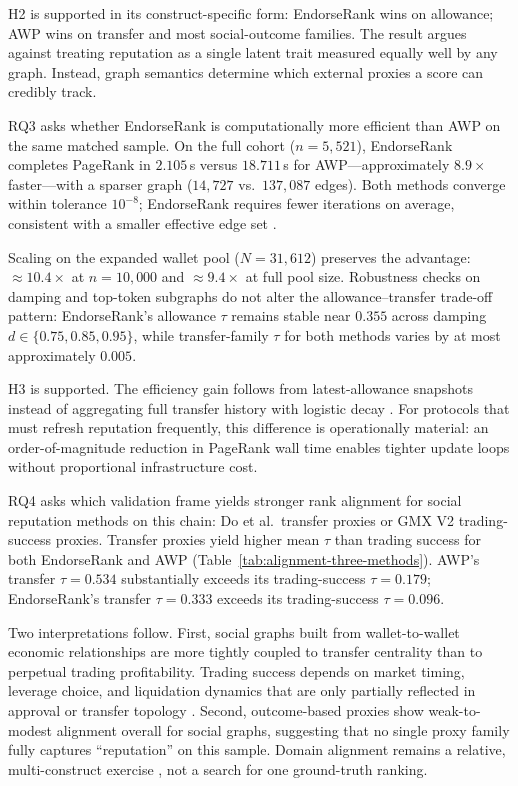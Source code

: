 H2 is supported in its construct-specific form: EndorseRank wins on allowance; AWP wins on transfer and most social-outcome families. The result argues against treating reputation as a single latent trait measured equally well by any graph. Instead, graph semantics determine which external proxies a score can credibly track.


RQ3 asks whether EndorseRank is computationally more efficient than AWP on the same matched sample. On the full cohort ($n=5{,}521$), EndorseRank completes PageRank in $2.105$\,s versus $18.711$\,s for AWP---approximately $8.9\times$ faster---with a sparser graph ($14{,}727$ vs.\ $137{,}087$ edges). Both methods converge within tolerance $10^{-8}$; EndorseRank requires fewer iterations on average, consistent with a smaller effective edge set .

Scaling on the expanded wallet pool ($N=31{,}612$) preserves the advantage: $\approx 10.4\times$ at $n=10{,}000$ and $\approx 9.4\times$ at full pool size. Robustness checks on damping and top-token subgraphs do not alter the allowance--transfer trade-off pattern: EndorseRank's allowance $\tau$ remains stable near $0.355$ across damping $d \in \{0.75, 0.85, 0.95\}$, while transfer-family $\tau$ for both methods varies by at most approximately $0.005$.

H3 is supported. The efficiency gain follows from latest-allowance snapshots instead of aggregating full transfer history with logistic decay . For protocols that must refresh reputation frequently, this difference is operationally material: an order-of-magnitude reduction in PageRank wall time enables tighter update loops without proportional infrastructure cost.


RQ4 asks which validation frame yields stronger rank alignment for social reputation methods on this chain: Do et al.\ transfer proxies or GMX V2 trading-success proxies. Transfer proxies yield higher mean $\tau$ than trading success for both EndorseRank and AWP (Table~\ref{tab:alignment-three-methods}). AWP's transfer $\tau=0.534$ substantially exceeds its trading-success $\tau=0.179$; EndorseRank's transfer $\tau=0.333$ exceeds its trading-success $\tau=0.096$.

Two interpretations follow. First, social graphs built from wallet-to-wallet economic relationships are more tightly coupled to transfer centrality than to perpetual trading profitability. Trading success depends on market timing, leverage choice, and liquidation dynamics that are only partially reflected in approval or transfer topology . Second, outcome-based proxies show weak-to-modest alignment overall for social graphs, suggesting that no single proxy family fully captures ``reputation'' on this sample. Domain alignment remains a relative, multi-construct exercise , not a search for one ground-truth ranking.

